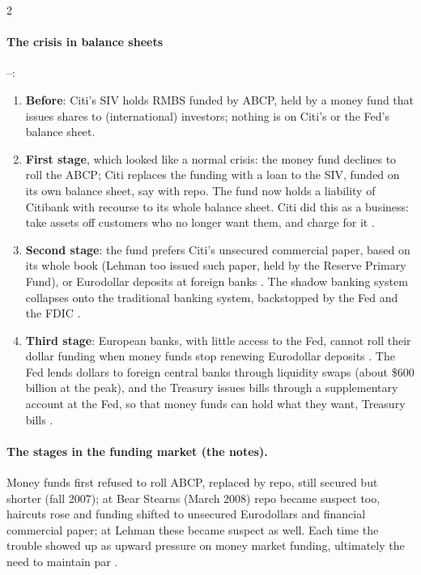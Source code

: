 \begin{paracol}{2}
\paragraph{The crisis in balance sheets} --:
\begin{enumerate}
  \item \textbf{Before}: Citi's SIV holds RMBS funded by ABCP, held by a money fund that issues shares to (international) investors; nothing is on Citi's or the Fed's balance sheet.
  \item \textbf{First stage}, which looked like a normal crisis: the money fund declines to roll the ABCP; Citi replaces the funding with a loan to the SIV, funded on its own
        balance sheet, say with repo. The fund now holds a liability of Citibank with recourse to its whole balance sheet. Citi did this as a business: take assets off customers who
        no longer want them, and charge for it .
  \item \textbf{Second stage}: the fund prefers Citi's unsecured commercial paper, based on its whole book (Lehman too issued such paper, held by the Reserve Primary Fund), or
        Eurodollar deposits at foreign banks . The shadow banking system collapses onto the traditional banking system,
        backstopped by the Fed and the FDIC .
  \item \textbf{Third stage}: European banks, with little access to the Fed, cannot roll their dollar funding when money funds stop renewing Eurodollar deposits
        . The Fed lends dollars to foreign central banks through liquidity swaps (about \$600 billion at the peak), and the Treasury issues bills
        through a supplementary account at the Fed, so that money funds can hold what they want, Treasury bills .
\end{enumerate}
\begin{taccts}
\quad
{}\quad
{}
\end{taccts}

\paragraph{The stages in the funding market (the notes).} Money funds first refused to roll ABCP, replaced by repo, still secured but shorter (fall 2007); at Bear Stearns (March 2008) repo
became suspect too, haircuts rose and funding shifted to unsecured Eurodollars and financial commercial paper; at Lehman these became suspect as well. Each time the trouble showed up as
upward pressure on money market funding, ultimately the need to maintain par .


\end{paracol}
